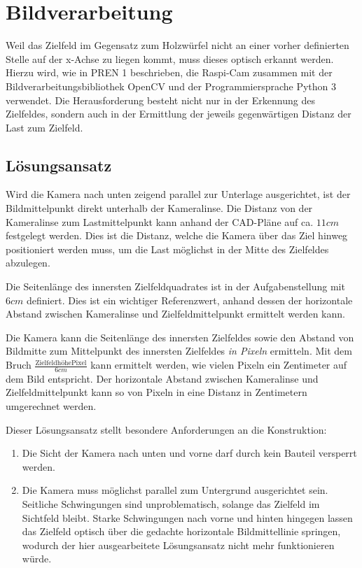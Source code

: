 \section{Bildverarbeitung}
\label{sec:bildverarbeitung}

Weil das Zielfeld im Gegensatz zum Holzwürfel nicht an einer vorher definierten Stelle auf der x-Achse zu liegen kommt, muss dieses optisch erkannt werden. Hierzu wird, wie in PREN 1 \cite[S. 25-26]{pren1} beschrieben, die Raspi-Cam zusammen mit der Bildverarbeitungsbibliothek OpenCV und der Programmiersprache Python 3 verwendet. Die Herausforderung besteht nicht nur in der Erkennung des Zielfeldes, sondern auch in der Ermittlung der jeweils gegenwärtigen Distanz der Last zum Zielfeld.

\subsection{Lösungsansatz}
\label{sec:loesungsansatz}

Wird die Kamera nach unten zeigend parallel zur Unterlage ausgerichtet, ist der Bildmittelpunkt direkt unterhalb der Kameralinse. Die Distanz von der Kameralinse zum Lastmittelpunkt kann anhand der CAD-Pläne auf ca. $11cm$ festgelegt werden. Dies ist die Distanz, welche die Kamera über das Ziel hinweg positioniert werden muss, um die Last möglichst in der Mitte des Zielfeldes abzulegen.

Die Seitenlänge des innersten Zielfeldquadrates ist in der Aufgabenstellung mit $6cm$ definiert. Dies ist ein wichtiger Referenzwert, anhand dessen der horizontale Abstand zwischen Kameralinse und Zielfeldmittelpunkt ermittelt werden kann.

Die Kamera kann die Seitenlänge des innersten Zielfeldes sowie den Abstand von Bildmitte zum Mittelpunkt des innersten Zielfeldes \textit{in Pixeln} ermitteln. Mit dem Bruch $\frac{\text{ZielfeldhöhePixel}}{6cm}$ kann ermittelt werden, wie vielen Pixeln ein Zentimeter auf dem Bild entspricht. Der horizontale Abstand zwischen Kameralinse und Zielfeldmittelpunkt kann so von Pixeln in eine Distanz in Zentimetern umgerechnet werden.

Dieser Lösungsansatz stellt besondere Anforderungen an die Konstruktion:

\begin{enumerate}
    \item Die Sicht der Kamera nach unten und vorne darf durch kein Bauteil versperrt werden.
    \item Die Kamera muss möglichst parallel zum Untergrund ausgerichtet sein. Seitliche Schwingungen sind unproblematisch, solange das Zielfeld im Sichtfeld bleibt. Starke Schwingungen nach vorne und hinten hingegen lassen das Zielfeld optisch über die gedachte horizontale Bildmittellinie springen, wodurch der hier ausgearbeitete Lösungsansatz nicht mehr funktionieren würde.
\end{enumerate}

